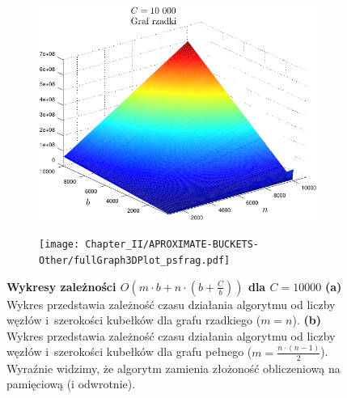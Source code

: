 \begin{figure}[!htbp]
	\centering
	\begin{subfigure}[b]{0.42\textwidth}
		\includegraphics[width=\textwidth]{Chapter_II/APROXIMATE-BUCKETS-Other/sparseGraphPlot3D_psfrag.pdf}
		\caption{}
	\end{subfigure}
	\qquad
	\begin{subfigure}[b]{0.42\textwidth}
		\texttt{[image: Chapter\_II/APROXIMATE-BUCKETS-Other/fullGraph3DPlot\_psfrag.pdf]}
		\caption{}
	\end{subfigure}
	\caption{\textbf{Wykresy zależności $ O \left( m \cdot b + n \cdot \left( b + \frac{C}{b} \right) \right) $ dla $C = 10000$ } \textbf{(a)} Wykres przedstawia zależność czasu działania algorytmu od liczby węzłów i~szerokości kubełków dla grafu rzadkiego ($ m = n $). \textbf{(b)} Wykres przedstawia zależność czasu działania algorytmu od liczby węzłów i~szerokości kubełków dla grafu pełnego ($ m = \frac{n \cdot \left( n - 1\right)}{2}$). Wyraźnie widzimy, że algorytm zamienia złożoność obliczeniową na pamięciową (i odwrotnie). }\label{fig:plotAproximateBucketsComplexity}
\end{figure}

